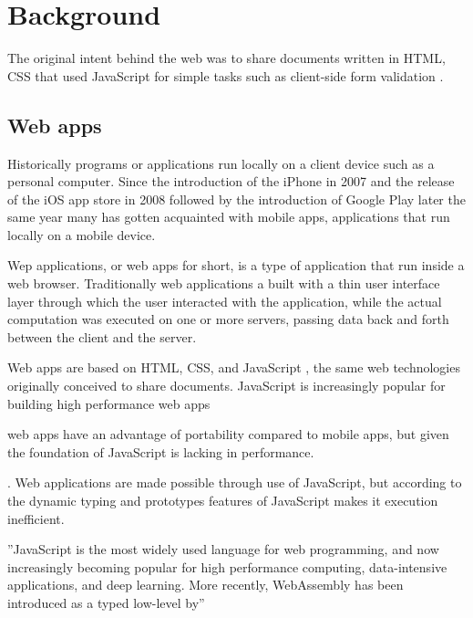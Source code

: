 \section{Background}

The original intent behind the web was to share documents written in HTML, CSS that used JavaScript for simple tasks such as client-side form validation \parencite{Moller2018,Zakai2018}.



\subsection{Web apps}

Historically programs or applications run locally on a client device such as a personal computer. Since the introduction of the iPhone in 2007 and the release of the iOS app store in 2008 followed by the introduction of Google Play later the same year many %
has gotten acquainted with mobile apps, applications that run locally on a mobile device.

Wep applications, or web apps for short, is a type of application that run inside a web browser. Traditionally web applications a built with a thin user interface layer through which the user interacted with the application, while the actual computation was executed on one or more servers, %
passing data back and forth between the client and the server.

Web apps are based on HTML, CSS, and JavaScript \parencite{ParkJungMoon2015}, the same web technologies originally conceived to share documents. JavaScript is increasingly popular for building high performance web apps \parencite{SandhuHerreraHendren2018}

web apps have an advantage of portability compared to mobile apps, but given the foundation of JavaScript is lacking in performance.

. Web applications are made possible through use of JavaScript, but according to \textcite{ParkJungMoon2015} the dynamic typing and prototypes features of JavaScript makes it execution inefficient. 

''JavaScript is the most widely used language for web programming, and now increasingly becoming popular for high performance computing, data-intensive applications, and deep learning. More recently, WebAssembly has been introduced as a typed low-level by'' \parencite{SandhuHerreraHendren2018}


